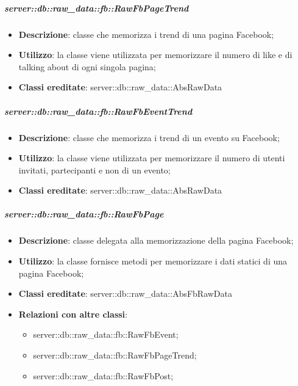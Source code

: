		\subparagraph{server::db::raw\_data::fb::RawFbPageTrend} %
		\label{subp:server_db_raw_data_fb_rowfbpagetrend}
			\begin{itemize}
				\item \textbf{Descrizione}: classe che memorizza i trend di una pagina Facebook;
				\item \textbf{Utilizzo}: la classe viene utilizzata per memorizzare il numero di like e di talking about di ogni singola pagina;
				\item \textbf{Classi ereditate}: server::db::raw\_data::AbsRawData
			\end{itemize}


		\subparagraph{server::db::raw\_data::fb::RawFbEventTrend} %
		\label{subp:server_db_raw_data_fb_rowfbeventtrend}
			\begin{itemize}
				\item \textbf{Descrizione}: classe che memorizza i trend di un evento su Facebook;
				\item \textbf{Utilizzo}: la classe viene utilizzata per memorizzare il numero di utenti invitati, partecipanti e non di un evento;
				\item \textbf{Classi ereditate}: server::db::raw\_data::AbsRawData
			\end{itemize}


		\subparagraph{server::db::raw\_data::fb::RawFbPage} %
		\label{subp:server_db_raw_data_fb_rawfbpage}
			\begin{itemize}
				\item \textbf{Descrizione}: classe delegata alla memorizzazione della pagina Facebook;
				\item \textbf{Utilizzo}: la classe fornisce metodi per memorizzare i dati statici di una pagina Facebook;
				\item \textbf{Classi ereditate}: server::db::raw\_data::AbsFbRawData
				\item \textbf{Relazioni con altre classi}:
					\begin{itemize}
						\item server::db::raw\_data::fb::RawFbEvent;
						\item server::db::raw\_data::fb::RawFbPageTrend;
						\item server::db::raw\_data::fb::RawFbPost;
					\end{itemize}
			\end{itemize}


